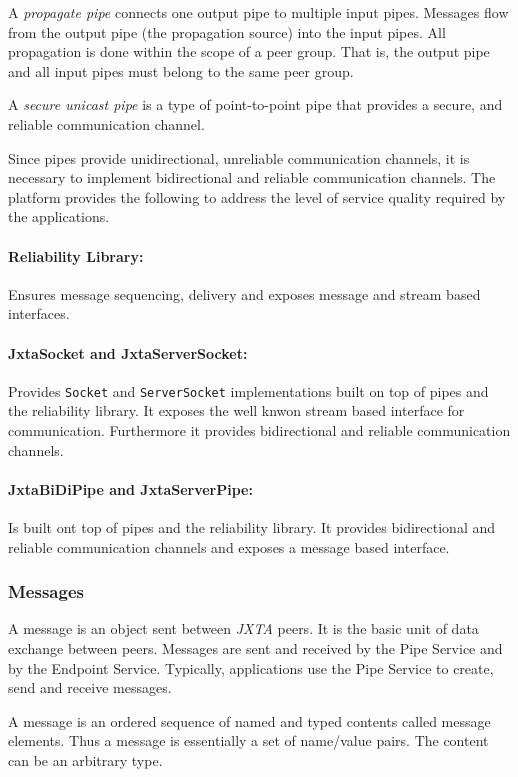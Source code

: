 A \emph{propagate pipe} connects one output pipe to multiple input pipes. Messages flow from the output pipe (the propagation source) into the input pipes. All propagation is done within the scope of a peer group. That is, the output pipe and all input pipes must belong to the same peer group. 

A \emph{secure unicast pipe} is a type of point-to-point pipe that provides a secure, and reliable communication channel. 

Since pipes provide unidirectional, unreliable communication channels, it is necessary to implement bidirectional and reliable communication channels. The platform provides the following to address the level of service quality required by the applications.

\paragraph{Reliability Library:} Ensures message sequencing, delivery and exposes message and stream based interfaces.
\paragraph{JxtaSocket and JxtaServerSocket:} Provides \texttt{Socket} and \texttt{ServerSocket} implementations built on top of pipes and the reliability library. It exposes the well knwon stream based interface for communication. Furthermore it provides bidirectional and reliable communication channels.
\paragraph{JxtaBiDiPipe and JxtaServerPipe:} Is built ont top of pipes and the reliability library. It provides bidirectional and reliable communication channels and exposes a message based interface.

\subsubsection{Messages}
A message is an object sent between \emph{JXTA} peers. It is the basic unit of data exchange between peers. Messages are sent and received by the Pipe Service and by the Endpoint Service. Typically, applications use the Pipe Service to create, send and receive messages. 

A message is an ordered sequence of named and typed contents called message elements. Thus a message is essentially a set of name/value pairs. The content can be an arbitrary type. 

